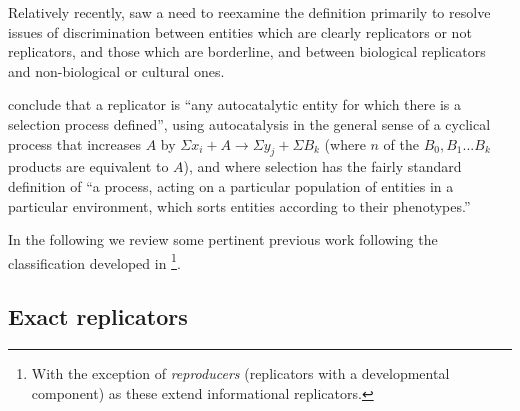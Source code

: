 %
%

Relatively recently, \textcite{Zachar2010} saw a need to reexamine the definition primarily to resolve issues of discrimination between entities which are clearly replicators or not replicators, and those which are borderline, and between biological replicators and non-biological or cultural ones. 


\Textcite{Zachar2010} conclude that a replicator is ``any autocatalytic entity for which there is a selection process defined'', using autocatalysis in the general sense of a cyclical process that increases $A$ by $\Sigma x_i + A\rightarrow \Sigma y_j + \Sigma B_k$ (where $n$ of the ${B_0, B_1...B_k}$ products are equivalent to $A$), and where selection has the fairly standard definition of ``a process, acting on a particular population of entities in a particular environment, which sorts entities according to their phenotypes.'' \parencite[p.21]{Zachar2010}

In the following  we review some pertinent previous work following the classification developed in \textcite{Zachar2010}\footnote{With the exception of \emph{reproducers} (replicators with a developmental component) as these extend informational replicators.}.

\subsection{Exact replicators}\label{non-informational-exact-replicators}

